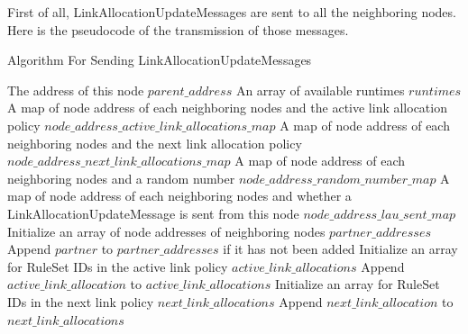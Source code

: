First of all, LinkAllocationUpdateMessages are sent to all the neighboring nodes. Here is the pseudocode of the transmission of those messages.

\begin{algorithm}[H]
  \caption{Algorithm For Sending LinkAllocationUpdateMessages}
  \begin{algorithmic}[1]
  \Require The address of this node $parent\_address$
  \Require An array of available runtimes $runtimes$
  \Require A map of node address of each neighboring nodes and the active link allocation policy $node\_address\_active\_link\_allocations\_map$
  \Require A map of node address of each neighboring nodes and the next link allocation policy $node\_address\_next\_link\_allocations\_map$
  \Require A map of node address of each neighboring nodes and a random number $node\_address\_random\_number\_map$
  \Require A map of node address of each neighboring nodes and whether a LinkAllocationUpdateMessage is sent from this node $node\_address\_lau\_sent\_map$
    \State Initialize an array of node addresses of neighboring nodes ${partner\_addresses}$
      \State Append $partner$ to ${partner\_addresses}$ if it has not been added
      \EndFor
    \EndFor
      \State Initialize an array for RuleSet IDs in the active link policy ${active\_link\_allocations}$
            \State Append $active\_link\_allocation$ to ${active\_link\_allocations}$
          \EndFor
        \EndIf
      \State Initialize an array for RuleSet IDs in the next link policy ${next\_link\_allocations}$
            \State Append $next\_link\_allocation$ to ${next\_link\_allocations}$
          \EndFor
        \EndIf
        \EndFor
        \EndFor
      \EndFor
    \end{algorithmic}
  \end{algorithm}

